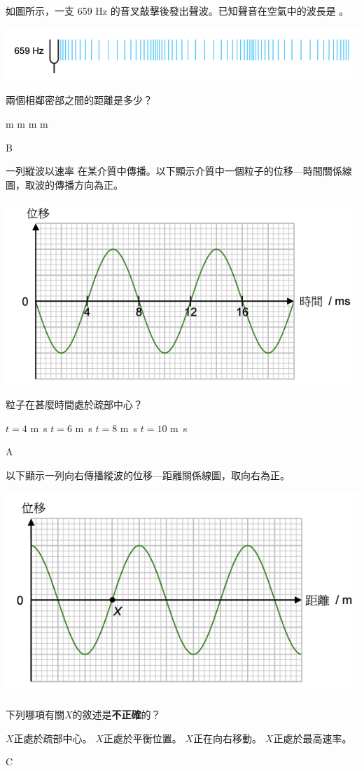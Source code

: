 {
    如圖所示，一支 659 Hz 的音叉敲擊後發出聲波。已知聲音在空氣中的波長是 。
    \par{\par\centering\includegraphics[width=.6\textwidth]{./img/ch1_earlyclass_wave_mc_2024-05-13-16-20-01.png}\par}
    兩個相鄰密部之間的距離是多少？
    \begin{tasks}
         m
         m
         m
         m
    \end{tasks}

}{\mckey B}

{
    一列縱波以速率 在某介質中傳播。以下顯示介質中一個粒子的位移—時間關係線圖，取波的傳播方向為正。
    \par{\par\centering\includegraphics[width=.5\textwidth]{./img/ch1_earlyclass_wave_mc_2024-05-13-16-21-19.png}\par}
    粒子在甚麼時間處於疏部中心？
    \begin{tasks}
        \task $t=4$ \unit{m.s}
        \task $t=6$ \unit{m.s}
        \task $t=8$ \unit{m.s}
        \task $t=10$ \unit{m.s}
    \end{tasks}


}{\mckey A}

{
    以下顯示一列向右傳播縱波的位移—距離關係線圖，取向右為正。
    \par{\par\centering\includegraphics[width=.5\textwidth]{./img/ch1_earlyclass_wave_mc_2024-05-13-16-22-56.png}\par}
    下列哪項有關$X$的敘述是\textbf{不正確}的？
    \begin{tasks}
        \task $X$正處於疏部中心。
        \task $X$正處於平衡位置。
        \task $X$正在向右移動。
        \task $X$正處於最高速率。
    \end{tasks}

}{\mckey C}